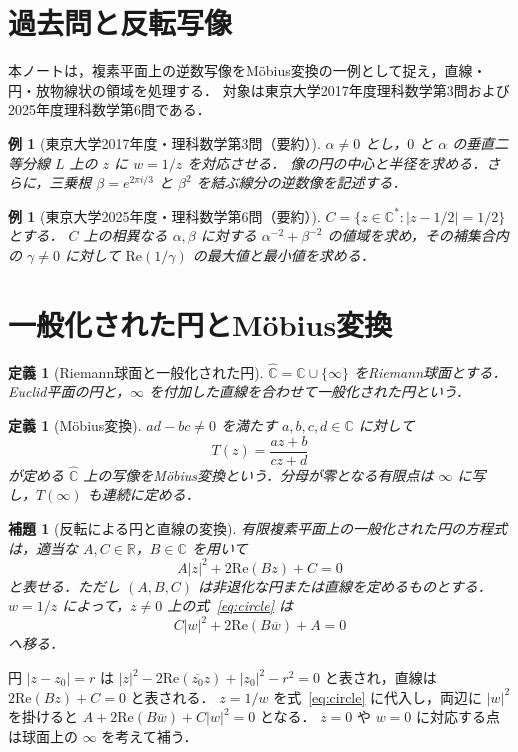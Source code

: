 \documentclass[a5paper,10pt,onecolumn]{jsarticle}
\makeatletter
\theoremstyle{mathnotetheorem}
\newtheorem{definition}[theorem]{定義}
\newtheorem{lemma}[theorem]{補題}
\newtheorem{example}[theorem]{例}
\renewcommand{\proofname}{証明}
\renewenvironment{proof}[1][\proofname]{%
  \par\pushQED{\qed}\normalfont\topsep4\p@\@plus2\p@\relax
  \trivlist\item[\hskip\labelsep\bfseries #1]\ignorespaces
}{\popQED\endtrivlist\@endpefalse}
\makeatother
\begin{document}
\section{過去問と反転写像}
本ノートは，複素平面上の逆数写像をM\"obius変換の一例として捉え，直線・円・放物線状の領域を処理する．
対象は東京大学2017年度理科数学第3問および2025年度理科数学第6問である．

\begin{example}[東京大学2017年度・理科数学第3問（要約）]\label{ex:2017}
$\alpha\ne0$ とし，$0$ と $\alpha$ の垂直二等分線 $L$ 上の $z$ に $w=1/z$ を対応させる．
像の円の中心と半径を求める．さらに，三乗根 $\beta=e^{2\pi i/3}$ と $\beta^2$ を結ぶ線分の逆数像を記述する．
\end{example}
\begin{example}[東京大学2025年度・理科数学第6問（要約）]\label{ex:2025}
$C=\{z\in\mathbb C^*:|z-1/2|=1/2\}$ とする．
$C$ 上の相異なる $\alpha,\beta$ に対する $\alpha^{-2}+\beta^{-2}$ の値域を求め，その補集合内の $\gamma\ne0$ に対して $\mathrm{Re}(1/\gamma)$ の最大値と最小値を求める．
\end{example}

\section{一般化された円とM\"obius変換}
\begin{definition}[Riemann球面と一般化された円]
$\widehat{\mathbb C}=\mathbb C\cup\{\infty\}$ をRiemann球面とする．
Euclid平面の円と，$\infty$ を付加した直線を合わせて一般化された円という．
\end{definition}
\begin{definition}[M\"obius変換]
$ad-bc\ne0$ を満たす $a,b,c,d\in\mathbb C$ に対して
\[
 T(z)=\frac{az+b}{cz+d}
\]
が定める $\widehat{\mathbb C}$ 上の写像をM\"obius変換という．分母が零となる有限点は $\infty$ に写し，$T(\infty)$ も連続に定める．
\end{definition}

\begin{lemma}[反転による円と直線の変換]\label{lem:inversion}
有限複素平面上の一般化された円の方程式は，適当な $A,C\in\mathbb R$，$B\in\mathbb C$ を用いて
\begin{equation}\label{eq:circle}
 A|z|^2+2\mathrm{Re}(Bz)+C=0
\end{equation}
と表せる．ただし $(A,B,C)$ は非退化な円または直線を定めるものとする．
$w=1/z$ によって，$z\ne0$ 上の式~\eqref{eq:circle} は
\[
 C|w|^2+2\mathrm{Re}(B\overline w)+A=0
\]
へ移る．
\end{lemma}
\begin{proof}
円 $|z-z_0|=r$ は $|z|^2-2\mathrm{Re}(\overline{z_0}z)+|z_0|^2-r^2=0$ と表され，直線は $2\mathrm{Re}(Bz)+C=0$ と表される．
$z=1/w$ を式~\eqref{eq:circle} に代入し，両辺に $|w|^2$ を掛けると
$A+2\mathrm{Re}(B\overline w)+C|w|^2=0$ となる．
$z=0$ や $w=0$ に対応する点は球面上の $\infty$ を考えて補う．
\end{proof}
\end{document}
